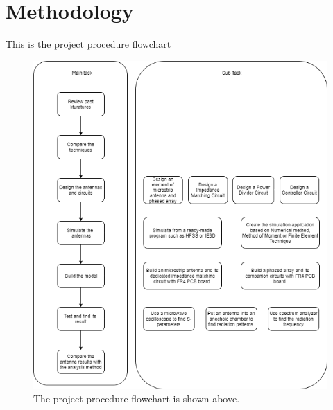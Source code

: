 \documentclass[11pt,a4paper]{article}
\begin{document}
  \section{Methodology}
    \indent This is the project procedure flowchart
    \begin{figure}[ht]
      \includegraphics{flowchart_ml.png}
        \centering
        \caption{The project procedure flowchart is shown above.}
    \end{figure}
    
    \newpage
    
\end{document}
